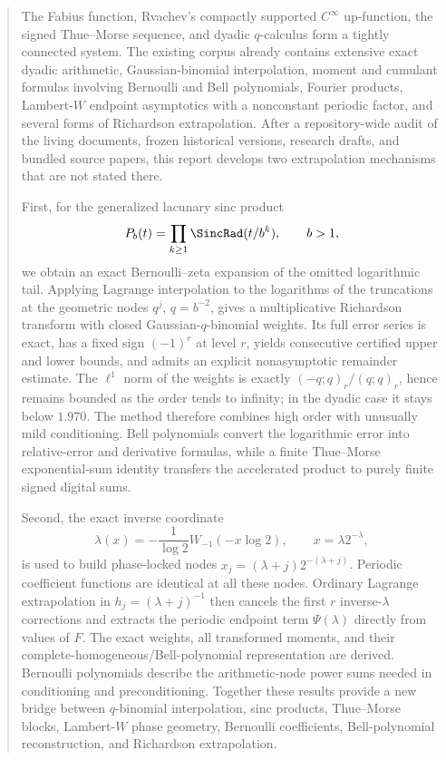 \documentclass[11pt]{article}
\numberwithin{equation}{section}
\theoremstyle{definition}
\theoremstyle{remark}
\begin{document}
\begin{abstract}
The Fabius function, Rvachev's compactly supported $C^\infty$ up-function, the signed Thue--Morse sequence, and dyadic $q$-calculus form a tightly connected system. The existing \repoPartll{} corpus already contains extensive exact dyadic arithmetic, Gaussian-binomial interpolation, moment and cumulant formulas involving Bernoulli and Bell polynomials, Fourier products, Lambert-$W$ endpoint asymptotics with a nonconstant periodic factor, and several forms of Richardson extrapolation. After a repository-wide audit of the living documents, frozen historical versions, research drafts, and bundled source papers, this report develops two extrapolation mechanisms that are not stated there.

First, for the generalized lacunary sinc product
\[
P_b(t)=\prod_{k\ge 1}\SincRad(t/b^k),\qquad b>1,
\]
we obtain an exact Bernoulli--zeta expansion of the omitted logarithmic tail. Applying Lagrange interpolation to the logarithms of the truncations at the geometric nodes $q^j$, $q=b^{-2}$, gives a multiplicative Richardson transform with closed Gaussian-$q$-binomial weights. Its full error series is exact, has a fixed sign $(-1)^r$ at level $r$, yields consecutive certified upper and lower bounds, and admits an explicit nonasymptotic remainder estimate. The $\ell^1$ norm of the weights is exactly $(-q;q)_r/(q;q)_r$, hence remains bounded as the order tends to infinity; in the dyadic case it stays below $1.970$. The method therefore combines high order with unusually mild conditioning. Bell polynomials convert the logarithmic error into relative-error and derivative formulas, while a finite Thue--Morse exponential-sum identity transfers the accelerated product to purely finite signed digital sums.

Second, the exact inverse coordinate
\[
\lambda(x)=-\frac{1}{\log 2}W_{-1}(-x\log 2),\qquad x=\lambda 2^{-\lambda},
\]
is used to build phase-locked nodes $x_j=(\lambda+j)2^{-(\lambda+j)}$. Periodic coefficient functions are identical at all these nodes. Ordinary Lagrange extrapolation in $h_j=(\lambda+j)^{-1}$ then cancels the first $r$ inverse-$\lambda$ corrections and extracts the periodic endpoint term $\Psi(\lambda)$ directly from values of $F$. The exact weights, all transformed moments, and their complete-homogeneous/Bell-polynomial representation are derived. Bernoulli polynomials describe the arithmetic-node power sums needed in conditioning and preconditioning. Together these results provide a new bridge between $q$-binomial interpolation, sinc products, Thue--Morse blocks, Lambert-$W$ phase geometry, Bernoulli coefficients, Bell-polynomial reconstruction, and Richardson extrapolation.
\end{abstract}
\end{document}
